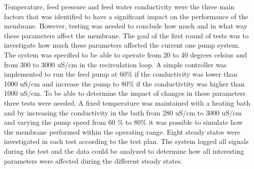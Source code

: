 Temperature, feed pressure and feed water conductivity were the three main factors that was identified to have a significant impact on the performance of the membrane. However, testing was needed to conclude how much and in what way these parameters affect the membrane. The goal of the first round of tests was to investigate how much these parameters affected the current one pump system. 
The system was specified to be able to operate from 20 to 40 degrees celsius and from 300 to 3000 uS/cm in the recirculation loop. A simple controller was implemented to run the feed pump at 60\% if the conductivity was lower than 1000 uS/cm and increase the pump to 80\% if the conductivtity was higher than 1000 uS/cm.  
To be able to determine the impact of changes in these parameters three tests were needed. A fixed temperature was maintained with a heating bath and by increasing the conductivity in the bath from 280 uS/cm to 3000 uS/cm and varying the pump speed from 60 \% to 80\% it was possible to simulate how the membrane performed within the operating range. Eight steady states were investigated in each test according to the test plan. The system logged all signals during the test and the data could be analyzed to determine how all interesting parameters were affected during the different steady states.


